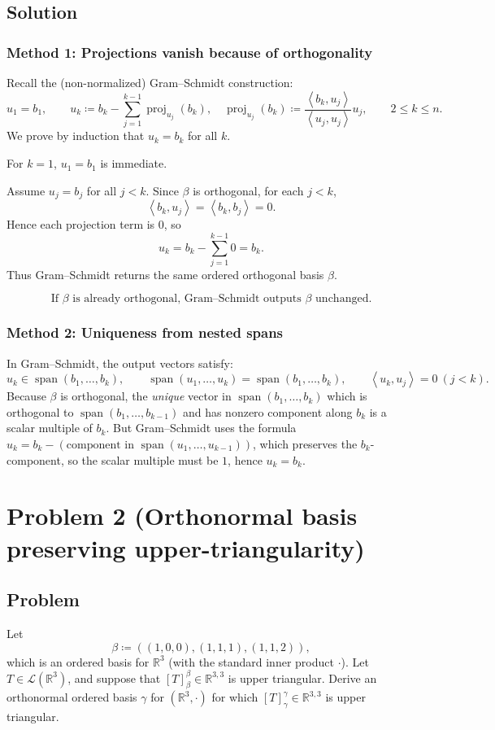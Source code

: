 \documentclass[12pt]{article}
\newcommand{\df}{\coloneqq}
\newcommand{\R}{\mathbb{R}}
\newcommand{\cL}{\mathcal{L}}
\DeclareMathOperator{\Span}{span}
\DeclareMathOperator{\proj}{proj}
\newcommand{\ip}[2]{\left\langle #1,#2\right\rangle}
\begin{document}
\subsection{Solution}

\subsubsection{Method 1: Projections vanish because of orthogonality}
Recall the (non-normalized) Gram--Schmidt construction:
\[
u_1=b_1,\qquad
u_k \df b_k-\sum_{j=1}^{k-1}\proj_{u_j}(b_k),
\quad
\proj_{u_j}(b_k)\df \frac{\ip{b_k}{u_j}}{\ip{u_j}{u_j}}u_j,\qquad 2\le k\le n.
\]
We prove by induction that $u_k=b_k$ for all $k$.

For $k=1$, $u_1=b_1$ is immediate.

Assume $u_j=b_j$ for all $j<k$. Since $\beta$ is orthogonal, for each $j<k$,
\[
\ip{b_k}{u_j}=\ip{b_k}{b_j}=0.
\]
Hence each projection term is $0$, so
\[
u_k=b_k-\sum_{j=1}^{k-1} 0=b_k.
\]
Thus Gram--Schmidt returns the same ordered orthogonal basis $\beta$.

\[
\boxed{\,\text{If }\beta\text{ is already orthogonal, Gram--Schmidt outputs }\beta\text{ unchanged.}\,}
\]

\subsubsection{Method 2: Uniqueness from nested spans}
In Gram--Schmidt, the output vectors satisfy:
\[
u_k\in \Span(b_1,\dots,b_k),
\qquad
\Span(u_1,\dots,u_k)=\Span(b_1,\dots,b_k),
\qquad
\ip{u_k}{u_j}=0\ (j<k).
\]
Because $\beta$ is orthogonal, the \emph{unique} vector in $\Span(b_1,\dots,b_k)$ which is orthogonal to
$\Span(b_1,\dots,b_{k-1})$ and has nonzero component along $b_k$ is a scalar multiple of $b_k$.
But Gram--Schmidt uses the formula $u_k=b_k-(\text{component in }\Span(u_1,\dots,u_{k-1}))$, which preserves the $b_k$-component,
so the scalar multiple must be $1$, hence $u_k=b_k$.

\newpage
\section{Problem 2 (Orthonormal basis preserving upper-triangularity)}
\subsection{Problem}
Let
\[
\beta \df ((1,0,0),(1,1,1),(1,1,2)),
\]
which is an ordered basis for $\R^3$ (with the standard inner product $\cdot$).
Let $T\in \cL(\R^3)$, and suppose that $[T]_{\beta}^{\beta}\in \R^{3,3}$ is upper triangular.
Derive an orthonormal ordered basis $\gamma$ for $(\R^3,\cdot)$ for which $[T]_{\gamma}^{\gamma}\in\R^{3,3}$ is upper triangular.
\end{document}
